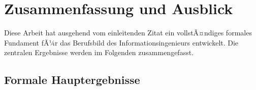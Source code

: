 ﻿\documentclass[a4paper,12pt]{report}
\theoremstyle{definition}
\begin{document}

\chapter{Zusammenfassung und Ausblick}
\label{sec:zusammenfassung}

Diese Arbeit hat ausgehend vom einleitenden Zitat ein vollstÃ¤ndiges formales
Fundament fÃ¼r das Berufsbild des Informationsingenieurs entwickelt.
Die zentralen Ergebnisse werden im Folgenden zusammengefasst.

\section{Formale Hauptergebnisse}
\end{document}
